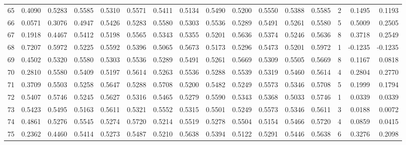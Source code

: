 \begin{tabular}{lrrrrrrrrrrrrrrr}
65  &      0.4090 &  0.5283 &  0.5585 &  0.5310 &  0.5571 &  0.5411 &  0.5134 &  0.5490 &  0.5200 &  0.5550 &   0.5388 &     0.5585 &      2 &                    0.1495 &                     0.1193 \\
66  &      0.0571 &  0.3076 &  0.4947 &  0.5426 &  0.5283 &  0.5580 &  0.5303 &  0.5536 &  0.5289 &  0.5491 &   0.5261 &     0.5580 &      5 &                    0.5009 &                     0.2505 \\
67  &      0.1918 &  0.4467 &  0.5412 &  0.5198 &  0.5565 &  0.5343 &  0.5355 &  0.5201 &  0.5636 &  0.5374 &   0.5246 &     0.5636 &      8 &                    0.3718 &                     0.2549 \\
68  &      0.7207 &  0.5972 &  0.5225 &  0.5592 &  0.5396 &  0.5065 &  0.5673 &  0.5173 &  0.5296 &  0.5473 &   0.5201 &     0.5972 &      1 &                   -0.1235 &                    -0.1235 \\
69  &      0.4502 &  0.5320 &  0.5580 &  0.5303 &  0.5536 &  0.5289 &  0.5491 &  0.5261 &  0.5669 &  0.5309 &   0.5505 &     0.5669 &      8 &                    0.1167 &                     0.0818 \\
70  &      0.2810 &  0.5580 &  0.5409 &  0.5197 &  0.5614 &  0.5263 &  0.5536 &  0.5288 &  0.5539 &  0.5319 &   0.5460 &     0.5614 &      4 &                    0.2804 &                     0.2770 \\
71  &      0.3709 &  0.5503 &  0.5258 &  0.5647 &  0.5288 &  0.5708 &  0.5200 &  0.5482 &  0.5249 &  0.5573 &   0.5346 &     0.5708 &      5 &                    0.1999 &                     0.1794 \\
72  &      0.5407 &  0.5746 &  0.5245 &  0.5627 &  0.5316 &  0.5465 &  0.5279 &  0.5590 &  0.5343 &  0.5368 &   0.5033 &     0.5746 &      1 &                    0.0339 &                     0.0339 \\
73  &      0.5423 &  0.5495 &  0.5163 &  0.5611 &  0.5321 &  0.5552 &  0.5315 &  0.5501 &  0.5249 &  0.5573 &   0.5346 &     0.5611 &      3 &                    0.0188 &                     0.0072 \\
74  &      0.4861 &  0.5276 &  0.5545 &  0.5274 &  0.5720 &  0.5214 &  0.5519 &  0.5278 &  0.5504 &  0.5154 &   0.5466 &     0.5720 &      4 &                    0.0859 &                     0.0415 \\
75  &      0.2362 &  0.4460 &  0.5414 &  0.5273 &  0.5487 &  0.5210 &  0.5638 &  0.5394 &  0.5122 &  0.5291 &   0.5446 &     0.5638 &      6 &                    0.3276 &                     0.2098 \\

\end{tabular}
